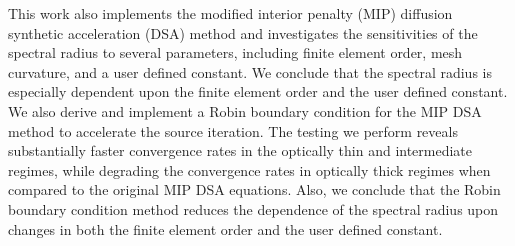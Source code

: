 \documentclass[12pt]{article}
\begin{document}
This work also implements the modified interior penalty (MIP) diffusion synthetic acceleration (DSA) method and investigates the sensitivities of the spectral radius to several parameters, including finite element order, mesh curvature, and a user defined constant. We conclude that the spectral radius is especially dependent upon the finite element order and the user defined constant. We also derive and implement a Robin boundary condition for the MIP DSA method to accelerate the source iteration. The testing we perform reveals substantially faster convergence rates in the optically thin and intermediate regimes, while degrading the convergence rates in optically thick regimes when compared to the original MIP DSA equations. Also, we conclude that the Robin boundary condition method reduces the dependence of the spectral radius upon changes in both the finite element order and the user defined constant.
\end{document}
